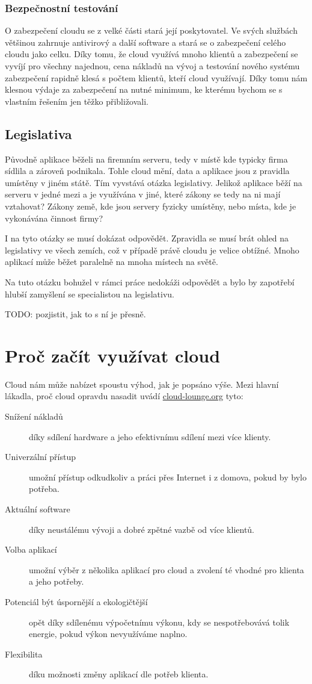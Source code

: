 \subsubsection{Bezpečnostní testování}
O zabezpečení cloudu se z velké části stará její poskytovatel. Ve svých službách většinou zahrnuje antivirový a další software a stará se o zabezpečení celého cloudu jako celku. Díky tomu, že cloud využívá mnoho klientů a zabezpečení se vyvíjí pro všechny najednou, cena nákladů na vývoj a testování nového systému zabezpečení rapidně klesá s počtem klientů, kteří cloud využívají. Díky tomu nám klesnou výdaje za zabezpečení na nutné minimum, ke kterému bychom se s vlastním řešením jen těžko přibližovali.

\subsection{Legislativa}
Původně aplikace běželi na firemním serveru, tedy v místě kde typicky firma sídlila a zároveň podnikala. Tohle cloud mění, data a aplikace jsou z pravidla umístěny v jiném státě. Tím vyvstává otázka legislativy. Jelikož aplikace běží na serveru v jedné mezi a je využívána v jiné, které zákony se tedy na ni mají vztahovat? Zákony země, kde jsou servery fyzicky umístěny, nebo místa, kde je vykonávána činnost firmy?

I na tyto otázky se musí dokázat odpovědět. Zpravidla se musí brát ohled na legislativy ve všech zemích, což v případě právě cloudu je velice obtížné. Mnoho aplikací může běžet paralelně na mnoha místech na světě.

Na tuto otázku bohužel v rámci práce nedokáži odpovědět a bylo by zapotřebí hlubší zamyšlení se specialistou na legislativu.

TODO: pozjistit, jak to s ní je přesně.

\section{Proč začít využívat cloud}
Cloud nám může nabízet spoustu výhod, jak je popsáno výše. Mezi hlavní lákadla, proč cloud opravdu nasadit uvádí \href{http://www.cloud-lounge.org/why-use-clouds.html}{cloud-lounge.org}\cite{cloudlounge:ProcCloud} tyto:
\begin{description}
	\item [Snížení nákladů] díky sdílení hardware a jeho efektivnímu sdílení mezi více klienty.
	\item [Univerzální přístup] umožní přístup odkudkoliv a práci přes Internet i z domova, pokud by bylo potřeba.
	\item [Aktuální software] díky neustálému vývoji a dobré zpětné vazbě od více klientů.
	\item [Volba aplikací] umožní výběr z několika aplikací pro cloud a zvolení té vhodné pro klienta a jeho potřeby.
	\item [Potenciál být úspornější a ekologičtější] opět díky sdílenému výpočetnímu výkonu, kdy se nespotřebovává tolik energie, pokud výkon nevyužíváme naplno.
	\item [Flexibilita] díku možnosti změny aplikací dle potřeb klienta.
\end{description}

